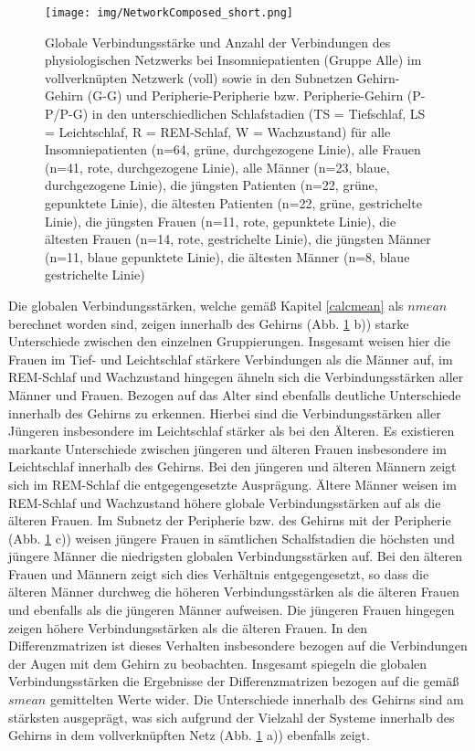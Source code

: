 \begin{figure}[H]
	\centering
	\texttt{[image: img/NetworkComposed\_short.png]}
	\caption[Globale Verbindungsstärke und Anzahl der Verbindungen des physiologischen Netzwerks bei Insomniepatienten]{Globale Verbindungsstärke und Anzahl der Verbindungen des physiologischen Netzwerks bei Insomniepatienten (Gruppe Alle) im vollverknüpten Netzwerk (voll) sowie in den Subnetzen Gehirn-Gehirn (G-G) und Peripherie-Peripherie bzw. Peripherie-Gehirn (P-P/P-G) in den unterschiedlichen Schlafstadien (TS = Tiefschlaf, LS = Leichtschlaf, R = \acs{REM}-Schlaf, W = Wachzustand) für
alle Insomniepatienten (n=64, grüne, durchgezogene Linie), alle Frauen (n=41, rote, durchgezogene Linie), alle Männer (n=23, blaue, durchgezogene Linie), die jüngsten Patienten (n=22, grüne, gepunktete Linie), die ältesten Patienten (n=22, grüne, gestrichelte Linie), die jüngsten Frauen (n=11, rote, gepunktete Linie), die ältesten Frauen (n=14, rote, gestrichelte Linie), die jüngsten Männer (n=11, blaue gepunktete Linie), die ältesten Männer (n=8, blaue gestrichelte Linie)}
	\label{fig:NetworkComposed_short}
\end{figure}

Die globalen Verbindungsstärken, welche gemäß Kapitel \ref{calcmean} als $nmean$ berechnet worden sind, zeigen innerhalb des Gehirns (Abb. \ref{fig:NetworkComposed_short} b)) starke Unterschiede zwischen den einzelnen Gruppierungen. Insgesamt weisen hier die Frauen im Tief- und Leichtschlaf stärkere Verbindungen als die Männer auf, im \acs{REM}-Schlaf und Wachzustand hingegen ähneln sich die Verbindungsstärken aller Männer und Frauen. Bezogen auf das Alter sind ebenfalls deutliche Unterschiede innerhalb des Gehirns zu erkennen. Hierbei sind die Verbindungsstärken aller Jüngeren insbesondere im Leichtschlaf stärker als bei den Älteren. Es existieren markante Unterschiede zwischen jüngeren und älteren Frauen insbesondere im Leichtschlaf innerhalb des Gehirns. Bei den jüngeren und älteren Männern zeigt sich im \acs{REM}-Schlaf die entgegengesetzte Ausprägung. Ältere Männer weisen im \acs{REM}-Schlaf und Wachzustand höhere globale Verbindungsstärken auf als die älteren Frauen. Im Subnetz der Peripherie bzw. des Gehirns mit der Peripherie (Abb. \ref{fig:NetworkComposed_short} c)) weisen jüngere Frauen in sämtlichen Schalfstadien die höchsten und jüngere Männer die niedrigsten globalen Verbindungsstärken auf. Bei den älteren Frauen und Männern zeigt sich dies Verhältnis entgegengesetzt, so dass die älteren Männer durchweg die höheren Verbindungsstärken als die älteren Frauen und ebenfalls als die jüngeren Männer aufweisen. Die jüngeren Frauen hingegen zeigen höhere Verbindungsstärken als die älteren Frauen. In den Differenzmatrizen ist dieses Verhalten insbesondere bezogen auf die Verbindungen der Augen mit dem Gehirn zu beobachten. Insgesamt spiegeln die globalen Verbindungsstärken die Ergebnisse der Differenzmatrizen bezogen auf die gemäß $smean$ gemittelten Werte wider. Die Unterschiede innerhalb des Gehirns sind am stärksten ausgeprägt, was sich aufgrund der Vielzahl der Systeme innerhalb des Gehirns in dem vollverknüpften Netz (Abb. \ref{fig:NetworkComposed_short} a)) ebenfalls zeigt.\\ 
 
